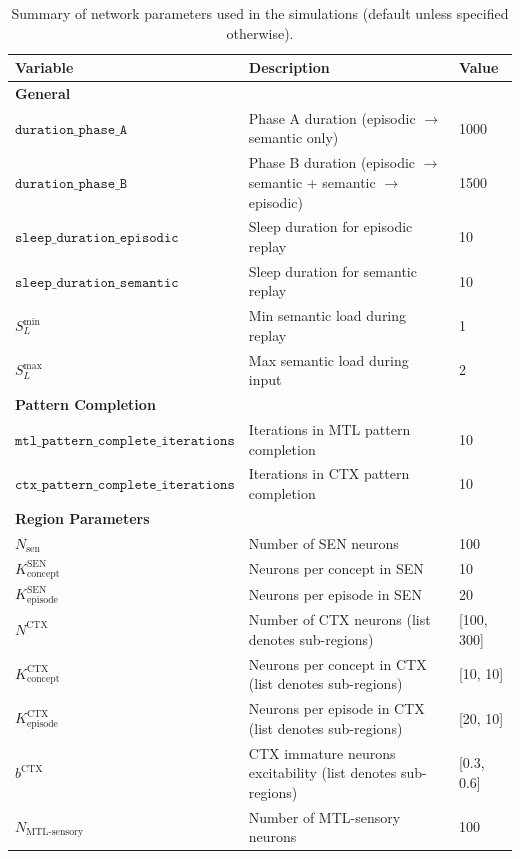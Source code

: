 \documentclass{article}
\begin{document}
\begin{table}[ht]
\small
\centering
\caption{Summary of network parameters used in the simulations (default unless specified otherwise).}
\label{tab:default_model}
\begin{tabular}{lp{6cm}l}
\toprule
\textbf{Variable} & \textbf{Description} & \textbf{Value} \\
\midrule
\multicolumn{3}{l}{\textbf{General}} \\
\midrule
$\texttt{duration\_phase\_A}$ & Phase A duration (episodic $\to$ semantic only) & 1000 \\
$\texttt{duration\_phase\_B}$ & Phase B duration (episodic $\to$ semantic + semantic $\to$ episodic) & 1500 \\
$\texttt{sleep\_duration\_episodic}$ & Sleep duration for episodic replay & 10 \\
$\texttt{sleep\_duration\_semantic}$ & Sleep duration for semantic replay & 10 \\
$S_L^\textrm{min}$ & Min semantic load during replay & 1 \\
$S_L^\textrm{max}$ & Max semantic load during input & 2 \\
\midrule
\multicolumn{3}{l}{\textbf{Pattern Completion}} \\
\midrule
$\texttt{mtl\_pattern\_complete\_iterations}$ & Iterations in MTL pattern completion & 10 \\
$\texttt{ctx\_pattern\_complete\_iterations}$ & Iterations in CTX pattern completion & 10 \\
\midrule
\multicolumn{3}{l}{\textbf{Region Parameters}} \\
\midrule
$N_{\text{sen}}$ & Number of SEN neurons & 100 \\
$K^\textrm{SEN}_\textrm{concept}$ & Neurons per concept in SEN & 10 \\
$K^\textrm{SEN}_\textrm{episode}$ & Neurons per episode in SEN & 20 \\
$N^{\text{CTX}}$ & Number of CTX neurons (list denotes sub-regions) & [100, 300] \\
$K^\textrm{CTX}_\textrm{concept}$ & Neurons per concept in CTX (list denotes sub-regions) & [10,  10] \\
$K^\textrm{CTX}_\textrm{episode}$ & Neurons per episode in CTX (list denotes sub-regions) & [20,  10] \\
$b^\text{CTX}$ & CTX immature neurons excitability (list denotes sub-regions) & [0.3, 0.6] \\
$N_{\text{MTL-sensory}}$ & Number of MTL-sensory neurons & 100 \\

\end{tabular}
\end{table}
\end{document}
